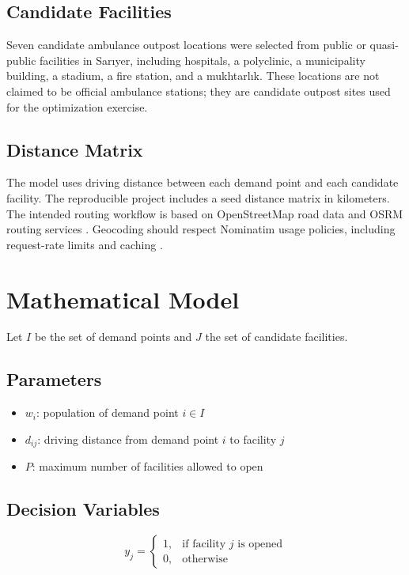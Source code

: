 \documentclass[11pt,a4paper]{article}
\begin{document}
\subsection{Candidate Facilities}

Seven candidate ambulance outpost locations were selected from public or quasi-public facilities in Sar{\i}yer, including hospitals, a polyclinic, a municipality building, a stadium, a fire station, and a mukhtarl{\i}k.
These locations are not claimed to be official ambulance stations; they are candidate outpost sites used for the optimization exercise.

\subsection{Distance Matrix}

The model uses driving distance between each demand point and each candidate facility.
The reproducible project includes a seed distance matrix in kilometers.
The intended routing workflow is based on OpenStreetMap road data and OSRM routing services \cite{openstreetmap,osrm_api}.
Geocoding should respect Nominatim usage policies, including request-rate limits and caching \cite{nominatim_policy}.

\section{Mathematical Model}

Let $I$ be the set of demand points and $J$ the set of candidate facilities.

\subsection{Parameters}

\begin{itemize}
    \item $w_i$: population of demand point $i \in I$
    \item $d_{ij}$: driving distance from demand point $i$ to facility $j$
    \item $P$: maximum number of facilities allowed to open
\end{itemize}

\subsection{Decision Variables}

\[
y_j =
\begin{cases}
1, & \text{if facility } j \text{ is opened} \\
0, & \text{otherwise}
\end{cases}
\]
\end{document}
